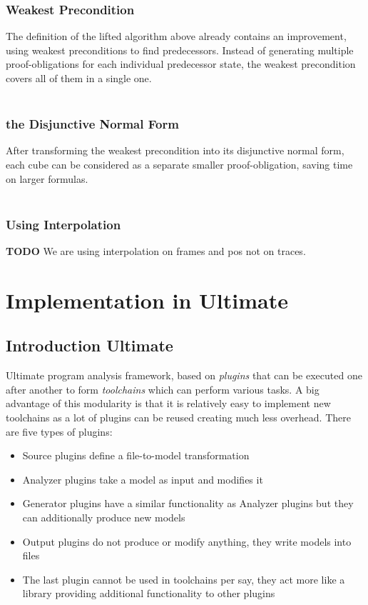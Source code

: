 \documentclass[11pt, a4paper, BCOR=10mm, ngerman, oneside]{scrbook}
\begin{document}
\subsection{Weakest Precondition}
The definition of the lifted algorithm above already contains an improvement, using weakest preconditions to find predecessors. Instead of generating multiple proof-obligations for each individual predecessor state, the weakest precondition covers all of them in a single one. \\ \\


\subsection{the Disjunctive Normal Form}
After transforming the weakest precondition into its disjunctive normal form, each cube can be considered as a separate smaller proof-obligation, saving time on larger formulas.\\ \\

\subsection{Using Interpolation}
\textbf{TODO}
We are using interpolation on frames and pos not on traces.

\pagebreak


\chapter{Implementation in Ultimate}
\section{Introduction Ultimate}
Ultimate program analysis framework, based on \textsl{plugins} that can be executed one after another to form \textsl{toolchains} which can perform various tasks. A big advantage of this modularity is that it is relatively easy to implement new toolchains as a lot of plugins can be reused creating much less overhead. There are five types of plugins: 
\begin{itemize}
\item Source plugins define a file-to-model transformation

\item  Analyzer plugins take a model as input and modifies it

\item Generator plugins have a similar functionality as Analyzer plugins but they can additionally produce new models

\item Output plugins do not produce or modify anything, they write models into files

\item The last plugin cannot be used in toolchains per say, they act more like a library providing additional functionality to other plugins

\end{itemize}
\end{document}
